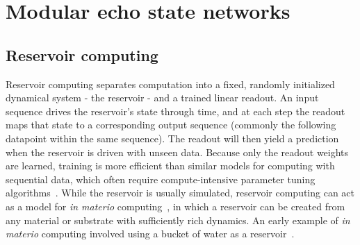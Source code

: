 
\renewcommand{\chapterlabel}{Chapter}
\chapter{Modular echo state networks}
\label{chap:ESNs}



\section{Reservoir computing}

Reservoir computing separates computation into a fixed, randomly initialized dynamical system - the reservoir - and a trained linear readout. An input sequence drives the reservoir's state through time, and at each step the readout maps that state to a corresponding output sequence (commonly the following datapoint within the same sequence). The readout will then yield a prediction when the reservoir is driven with unseen data. Because only the readout weights are learned, training is more efficient than similar models for computing with sequential data, which often require compute-intensive parameter tuning algorithms~\cite{jaeger_2001}. While the reservoir is usually simulated, reservoir computing can act as a model for \textit{in materio} computing~\cite{dale_2016}, in which a reservoir can be created from any material or substrate with sufficiently rich dynamics. An early example of \textit{in materio} computing involved using a bucket of water as a reservoir~\cite{fernando_and_sojakka_2003}.


